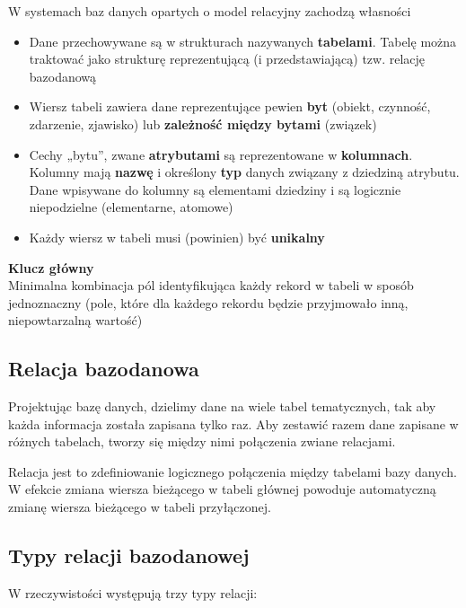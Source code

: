 \documentclass[12pt]{article}
\begin{document}
    W systemach baz danych opartych o model relacyjny zachodzą własności
    \begin{itemize}
        \item Dane przechowywane są w strukturach nazywanych \textbf{tabelami}. Tabelę można traktować jako strukturę reprezentującą (i przedstawiającą) tzw. relację bazodanową
        \item Wiersz tabeli zawiera dane reprezentujące pewien \textbf{byt} (obiekt, czynność, zdarzenie, zjawisko) lub \textbf{zależność między bytami} (związek)
        \item Cechy „bytu”, zwane \textbf{atrybutami} są reprezentowane w \textbf{kolumnach}. Kolumny mają \textbf{nazwę} i określony \textbf{typ} danych związany z dziedziną atrybutu. Dane wpisywane do kolumny są elementami dziedziny i są logicznie niepodzielne (elementarne, atomowe)
        \item Każdy wiersz w tabeli musi (powinien) być \textbf{unikalny}
    \end{itemize}
    
    \begin{definition}
    \textbf{Klucz główny}\\
    Minimalna kombinacja pól identyfikująca każdy rekord w tabeli w sposób jednoznaczny (pole, które dla każdego rekordu będzie przyjmowało inną, niepowtarzalną wartość)
    \end{definition}

    \subsection{Relacja bazodanowa}
    Projektując bazę danych, dzielimy dane na wiele tabel tematycznych, tak aby każda informacja została zapisana tylko raz. Aby zestawić razem dane zapisane w różnych tabelach, tworzy się między nimi połączenia zwiane relacjami.
    
    
    
    Relacja jest to zdefiniowanie logicznego połączenia między tabelami bazy danych. W efekcie zmiana wiersza bieżącego w tabeli głównej powoduje automatyczną zmianę wiersza bieżącego w tabeli przyłączonej.

    \subsection{Typy relacji bazodanowej}
    
    W rzeczywistości występują trzy typy relacji:
    
\end{document}
